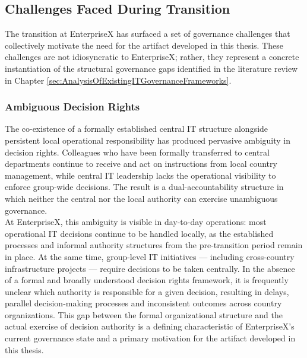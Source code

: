 \subsection{Challenges Faced During Transition}
\label{subsec:ChallengesFacedDuringTransition}
The transition at EnterpriseX has surfaced a set of governance challenges that collectively motivate the need for the artifact developed in this thesis.
These challenges are not idiosyncratic to EnterpriseX; rather, they represent a concrete instantiation of the structural governance gaps identified in the literature review in Chapter \ref{sec:AnalysisOfExistingITGovernanceFrameworks}.

\subsubsection{Ambiguous Decision Rights}
\label{subsubsec:AmbiguousDecisionRights}
The co-existence of a formally established central IT structure alongside persistent local operational responsibility has produced pervasive ambiguity in decision rights.
Colleagues who have been formally transferred to central departments continue to receive and act on instructions from local country management, while central IT leadership lacks the operational visibility to enforce group-wide decisions.
The result is a dual-accountability structure in which neither the central nor the local authority can exercise unambiguous governance.
\\
At EnterpriseX, this ambiguity is visible in day-to-day operations: most operational IT decisions continue to be handled locally, as the established processes and informal authority structures from the pre-transition period remain in place.
At the same time, group-level IT initiatives — including cross-country infrastructure projects — require decisions to be taken centrally.
In the absence of a formal and broadly understood decision rights framework, it is frequently unclear which authority is responsible for a given decision, resulting in delays, parallel decision-making processes and inconsistent outcomes across country organizations.
This gap between the formal organizational structure and the actual exercise of decision authority is a defining characteristic of EnterpriseX's current governance state and a primary motivation for the artifact developed in this thesis.

